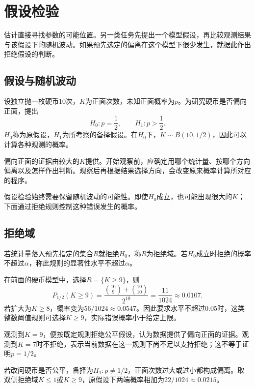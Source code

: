 \FloatBarrier
\newpage
\section{假设检验}
\label{sec:prob-testing}

估计直接寻找参数的可能位置。另一类任务先提出一个模型假设，再比较观测结果与该假设下的随机波动。如果预先选定的偏离在这个模型下很少发生，就据此作出拒绝假设的判断。

\subsection{假设与随机波动}

设独立抛一枚硬币10次，\(K\)为正面次数，未知正面概率为\(p\)。为研究硬币是否偏向正面，提出
\[
 H_0:p=\frac12,\qquad H_1:p>\frac12.
\]
\(H_0\)称为{\heiti 原假设}，\(H_1\)为所考察的{\heiti 备择假设}。在\(H_0\)下，\(K\sim B(10,1/2)\)，因此可以计算各种观测的概率。

偏向正面的证据由较大的\(K\)提供。开始观察前，应确定用哪个统计量、按哪个方向偏离以及怎样作出判断。观察后再根据结果选择方向，会改变原来概率计算所对应的程序。

假设检验始终需要保留随机波动的可能性。即使\(H_0\)成立，也可能出现很大的\(K\)；下面通过拒绝规则控制这种错误发生的概率。

\subsection{拒绝域}

\begin{definition}
若统计量落入预先指定的集合\(R\)就拒绝\(H_0\)，称\(R\)为{\heiti 拒绝域}。若\(H_0\)成立时拒绝的概率不超过\(\alpha\)，称此规则的显著性水平不超过\(\alpha\)。
\end{definition}

在前面的硬币模型中，选择\(R=\{K\ge9\}\)，则
\[
 P_{1/2}(K\ge9)=\frac{\binom{10}9+\binom{10}{10}}{2^{10}}
 =\frac{11}{1024}\approx0.0107.
\]
若扩大为\(K\ge8\)，概率变为\(56/1024\approx0.0547\)。因此要求水平不超过\(0.05\)时，这类整数阈值规则可选择\(K\ge9\)，实际错误概率小于给定上限。

观测到\(K=9\)，便按既定规则拒绝公平假设，认为数据提供了偏向正面的证据。观测到\(K=7\)时不拒绝，表示当前数据在这一规则下尚不足以支持拒绝；这不等于证明\(p=1/2\)。

若改问硬币是否公平，备择为\(H_1:p\ne1/2\)，正面次数过大或过小都构成偏离。取双侧拒绝域\(K\le1\)或\(K\ge9\)，原假设下两端概率相加为\(22/1024\approx0.0215\)。

